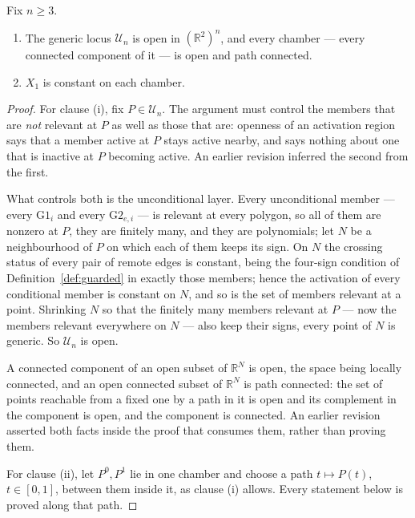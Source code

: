 \begin{proposition}\label{prop:chamberinv}
Fix $n\geq3$.
\begin{enumerate}
\item[(i)] The generic locus $\mathcal U_n$ is open in $(\mathbb R^2)^n$, and
every chamber --- every connected component of it --- is open and path connected.
\item[(ii)] $X_1$ is constant on each chamber.
\end{enumerate}
\end{proposition}
\begin{proof}
For clause (i), fix $P\in\mathcal U_n$. The argument must control the members that are
\emph{not} relevant at $P$ as well as those that are: openness of an activation
region says that a member active at $P$ stays active nearby, and says nothing
about one that is inactive at $P$ becoming active. An earlier revision inferred
the second from the first.

What controls both is the unconditional layer. Every unconditional member ---
every $\mathrm{G1}_i$ and every $\mathrm{G2}_{e,i}$ --- is relevant at every
polygon, so all of them are nonzero at $P$, they are finitely many, and they are
polynomials; let $N$ be a neighbourhood of $P$ on which each of them keeps its
sign. On $N$ the crossing status of every pair of remote edges is constant,
being the four-sign condition of Definition~\ref{def:guarded} in exactly those
members; hence the activation of every conditional member is constant on $N$,
and so is the set of members relevant at a point. Shrinking $N$ so that the
finitely many members relevant at $P$ --- now the members relevant everywhere on
$N$ --- also keep their signs, every point of $N$ is generic. So
$\mathcal U_n$ is open.

A connected component of an open subset of $\mathbb R^N$ is open, the space
being locally connected, and an open connected subset of $\mathbb R^N$ is path
connected: the set of points reachable from a fixed one by a path in it is open
and its complement in the component is open, and the component is connected. An
earlier revision asserted both facts inside the proof that consumes them,
rather than proving them.

For clause (ii), let $P^{0},P^{1}$ lie in one chamber and choose a path
$t\mapsto P(t)$, $t\in[0,1]$, between them inside it, as clause (i) allows.
Every statement below is proved along that path.


\end{proof}

